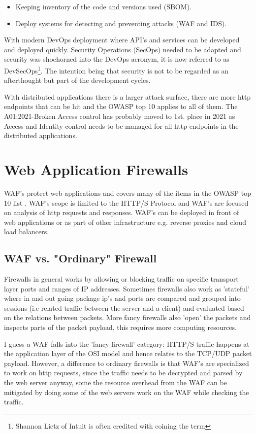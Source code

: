 \documentclass[
	letterpaper, %
	10pt, %
	unnumberedsections, %
	twoside, %
]{APAAssignment}
\begin{document}
\begin{itemize}
	\item Keeping inventory of the code and versions used (SBOM). 
	\item Deploy systems for detecting and preventing attacks (WAF and IDS).
\end{itemize}

With modern DevOps deployment where API's and services can be developed and deployed quickly. Security Operations (SecOps) needed to be adapted and security was shoehorned into the DevOps acronym, it is now referred to as DevSecOps\footnote{Shannon Lietz of Intuit is often credited with coining the term\cite{DevSecOps}}. The intention being that security is not to be regarded as an afterthought but part of the development cycles.  

With distributed applications there is a larger attack surface, there are more http endpoints that can be hit and the OWASP top 10 applies to all of them. The A01:2021-Broken Access control \cite{OWASPtop10} has probably moved to 1st. place in 2021 as Access and Identity control needs to be managed for all http endpoints in the distributed applications.       

\section{Web Application Firewalls}
WAF's protect web applications and covers many of the items in the OWASP top 10 list \cite{OWASPtop10}. WAF's scope is limited to the HTTP/S Protocol and WAF's are focused on analysis of http requests and responses. WAF's can be deployed in front of web applications or as part of other infrastructure e.g. reverse proxies and cloud load balancers.   

\subsection{WAF vs. "Ordinary" Firewall}
Firewalls in general works by allowing or blocking traffic on specific transport layer ports and ranges of IP addresses. Sometimes firewalls also work as 'stateful' where in and out going package ip's and ports are compared and grouped into sessions (i.e related traffic between the server and a client) and evaluated based on the relations between packets. More fancy firewalls also 'open' the packets and inspects parts of the packet payload, this requires more computing resources. 

I guess a WAF falls into the 'fancy firewall' category: HTTP/S traffic happens at the application layer of the OSI model and hence relates to the TCP/UDP packet payload. However, a difference to ordinary firewalls is that WAF's are specialized to work on http requests, since the traffic needs to be decrypted and parsed by the web server anyway, some the resource overhead from the WAF can be mitigated by doing some of the web servers work on the WAF while checking the traffic.    
\end{document}
